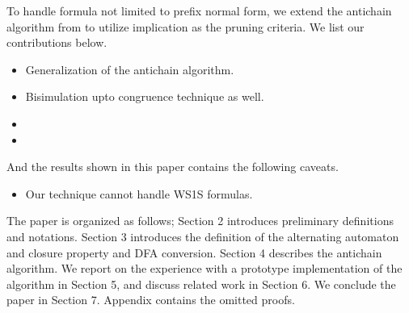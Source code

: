 To handle formula not limited to prefix normal form, we extend the antichain
algorithm from\cite{Wulf2006} to utilize implication as the pruning criteria. We
list our contributions below.

\begin{itemize}
\item Generalization of the antichain algorithm.
\item Bisimulation upto congruence technique\cite{BonchiP13} as well.
\item {}
\item {}
\end{itemize}

And the results shown in this paper contains the following caveats.
\begin{itemize}
\item Our technique cannot handle WS1S formulas.
\end{itemize}

The paper is organized as follows; Section 2 introduces preliminary definitions
and notations. Section 3 introduces the definition of the alternating automaton
and closure property and DFA conversion. Section 4 describes the antichain
algorithm. We report on the experience with a prototype implementation of the
algorithm in Section 5, and discuss related work in Section 6. We conclude the
paper in Section 7. Appendix contains the omitted proofs.
